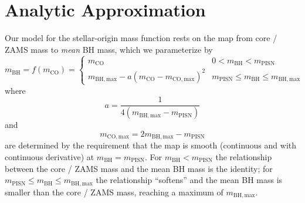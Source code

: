 \documentclass[modern]{aastex631}
\newcommand{\mBH}{\ensuremath{m_\mathrm{BH}}}
\newcommand{\mBHMax}{\ensuremath{m_{\mathrm{BH},\mathrm{max}}}}
\newcommand{\mCO}{\ensuremath{m_{\mathrm{CO}}}}
\newcommand{\mCOMax}{\ensuremath{m_{\mathrm{CO},\mathrm{max}}}}
\newcommand{\mPISN}{\ensuremath{m_\mathrm{PISN}}}
\begin{document}



\appendix

\section{Analytic Approximation}

Our model for the stellar-origin mass function rests on the map from core / \ac{ZAMS}
mass to \emph{mean} \ac{BH} mass, which we parameterize by 
\begin{equation}
    \mBH = f\left( \mCO \right) = \begin{cases}
        \mCO & 0 < \mBH < \mPISN \\
        \mBHMax - a \left( \mCO - \mCOMax \right)^2 & \mPISN \leq \mBH \leq \mBHMax
    \end{cases}
\end{equation}
where 
\begin{equation}
    a = \frac{1}{4\left( \mBHMax - \mPISN \right)}
\end{equation}
and
\begin{equation}
    \mCOMax = 2 \mBHMax - \mPISN
\end{equation}
are determined by the requirement that the map is smooth (continuous and with
continuous derivative) at $\mBH = \mPISN$.  For $\mBH < \mPISN$ the relationship
between the core / \ac{ZAMS} mass and the mean \ac{BH} mass is the identity; for
$\mPISN \leq \mBH \leq \mBHMax$ the relationship ``softens'' and the mean
\ac{BH} mass is smaller than the core / \ac{ZAMS} mass, reaching a maximum of
$\mBHMax$.
\end{document}
